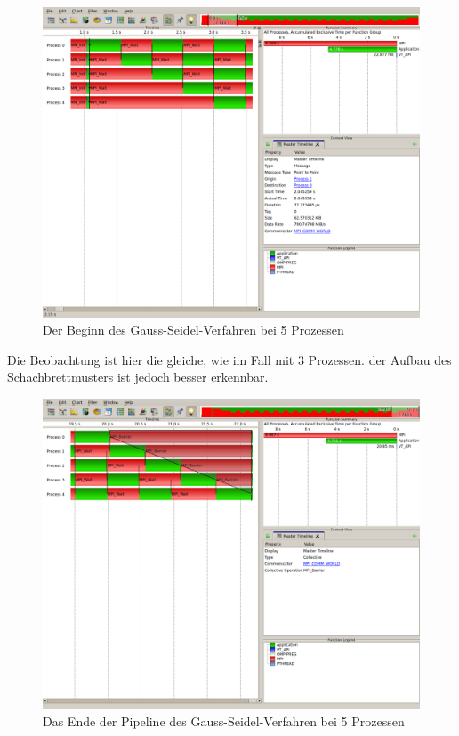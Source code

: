 \documentclass[a4paper,12pt]{scrartcl}
\begin{document}
\begin{figure}[hr!]
 \includegraphics[scale=0.45]{./5_4_GS/Start.png}
 \caption{Der Beginn des Gauss-Seidel-Verfahren bei 5 Prozessen}
\end{figure}
Die Beobachtung ist hier die gleiche, wie im Fall mit 3 Prozessen. der Aufbau des Schachbrettmusters ist jedoch besser erkennbar.  
\FloatBarrier
\begin{figure}[hr!]
 \includegraphics[scale=0.45]{./5_4_GS/End.png}
 \caption{Das Ende der Pipeline des Gauss-Seidel-Verfahren bei 5 Prozessen}
\end{figure}
\end{document}
